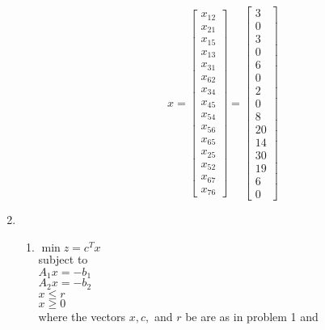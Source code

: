 \documentclass{article}
\begin{document}
\begin{enumerate}
\begin{enumerate}
$$
x = \begin{bmatrix}
x_{12} \\
x_{21} \\
x_{15} \\
x_{13} \\
x_{31} \\
x_{62} \\
x_{34} \\
x_{45} \\
x_{54} \\
x_{56} \\
x_{65} \\
x_{25} \\
x_{52} \\
x_{67} \\
x_{76}
\end{bmatrix}
= 
\begin{bmatrix}
3 \\
0 \\
3 \\
0\\
6 \\
0 \\
2 \\
0 \\
8 \\
20 \\
14 \\
30 \\
19 \\
6 \\
0
\end{bmatrix}
$$

\end{enumerate} 

\newpage
\item

\begin{enumerate}
\item
$\min z = c^Tx$\\
subject to \\
$A_1x = -b_1$\\
$A_2x = -b_2$\\
$x \leq r$ \\
$x \geq 0$ \\

where the vectors $x,c,$ and $r$ be are as in problem 1 and


\end{enumerate}
\end{enumerate}
\end{document}
